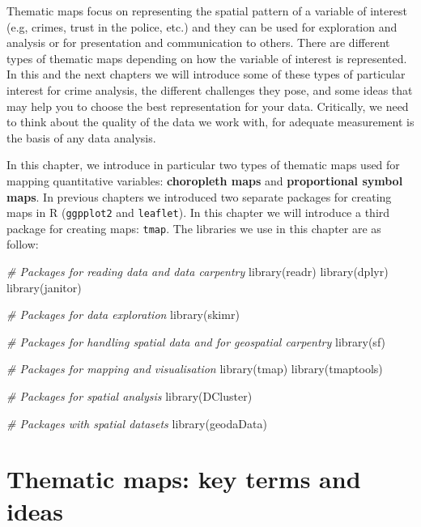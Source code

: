 \documentclass[
]{book}
\makeatletter
\newenvironment{Shaded}{\begin{snugshade}}{\end{snugshade}}
\newcommand{\CommentTok}[1]{\textcolor[rgb]{0.37,0.37,0.37}{\textit{#1}}}
\newcommand{\FunctionTok}[1]{\textcolor[rgb]{0,0,0}{#1}}
\newcommand{\NormalTok}[1]{#1}
\newenvironment{kframe}{%
\medskip{}
\setlength{\fboxsep}{.8em}
 \def\at@end@of@kframe{}%
 \ifinner\ifhmode%
  \def\at@end@of@kframe{\end{minipage}}%
  \begin{minipage}{\columnwidth}%
 \fi\fi%
 \def\FrameCommand##1{\hskip\@totalleftmargin \hskip-\fboxsep
 \colorbox{shadecolor}{##1}\hskip-\fboxsep
     \hskip-\linewidth \hskip-\@totalleftmargin \hskip\columnwidth}%
 \MakeFramed {\advance\hsize-\width
   \@totalleftmargin\z@ \linewidth\hsize
   \@setminipage}}%
 {\par\unskip\endMakeFramed%
 \at@end@of@kframe}
\renewenvironment{Shaded}{\begin{kframe}}{\end{kframe}}
\makeatother
\begin{document}
Thematic maps focus on representing the spatial pattern of a variable of interest (e.g, crimes, trust in the police, etc.) and they can be used for exploration and analysis or for presentation and communication to others. There are different types of thematic maps depending on how the variable of interest is represented. In this and the next chapters we will introduce some of these types of particular interest for crime analysis, the different challenges they pose, and some ideas that may help you to choose the best representation for your data. Critically, we need to think about the quality of the data we work with, for adequate measurement is the basis of any data analysis.

In this chapter, we introduce in particular two types of thematic maps used for mapping quantitative variables: \textbf{choropleth maps} and \textbf{proportional symbol maps}. In previous chapters we introduced two separate packages for creating maps in R (\texttt{ggpplot2} and \texttt{leaflet}). In this chapter we will introduce a third package for creating maps: \texttt{tmap}. The libraries we use in this chapter are as follow:

\begin{Shaded}
\begin{Highlighting}[]
\CommentTok{\# Packages for reading data and data carpentry}
\FunctionTok{library}\NormalTok{(readr)}
\FunctionTok{library}\NormalTok{(dplyr)}
\FunctionTok{library}\NormalTok{(janitor)}

\CommentTok{\# Packages for data exploration}
\FunctionTok{library}\NormalTok{(skimr)}

\CommentTok{\# Packages for handling spatial data and for geospatial carpentry}
\FunctionTok{library}\NormalTok{(sf)}

\CommentTok{\# Packages for mapping and visualisation}
\FunctionTok{library}\NormalTok{(tmap)}
\FunctionTok{library}\NormalTok{(tmaptools)}

\CommentTok{\# Packages for spatial analysis}
\FunctionTok{library}\NormalTok{(DCluster)}

\CommentTok{\# Packages with spatial datasets}
\FunctionTok{library}\NormalTok{(geodaData)}
\end{Highlighting}
\end{Shaded}

\hypertarget{thematic-maps-key-terms-and-ideas}{%
\section{Thematic maps: key terms and ideas}\label{thematic-maps-key-terms-and-ideas}}
\end{document}
